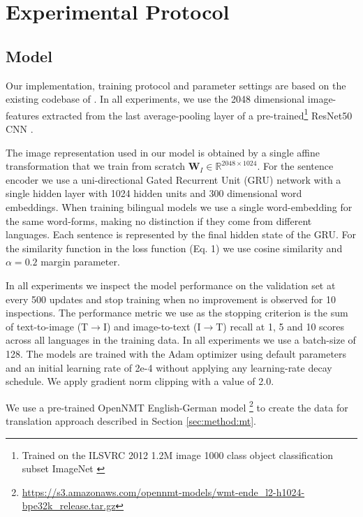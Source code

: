 \section{Experimental Protocol}

\subsection{Model}

Our implementation, training protocol and parameter settings are based on the existing codebase of \cite{kadar2018conll}.
In all experiments, we use the 2048 dimensional image-features extracted from the
last average-pooling layer of a pre-trained\footnote{Trained on the ILSVRC 2012 1.2M image 1000 class object classification
subset ImageNet \cite{russakovsky2015imagenet}} 
ResNet50 CNN \cite{he2016deep}. 
  
The image representation used in our model is obtained by a single 
affine transformation that we train from scratch 
$\mathbf{W}_{I} \in \mathbb{R}^{2048 \times 1024}$. For the sentence
encoder we use a uni-directional Gated Recurrent Unit (GRU) 
network \cite{cho2014properties} with a single hidden layer with 
1024  hidden units and 300 dimensional word embeddings. 
When training bilingual models we use a single word-embedding
for the same word-forms, making no distinction if they come 
from different languages. Each sentence is represented by the final 
hidden state of the GRU. For the similarity function in the loss function (Eq. 1) we use cosine similarity and $\alpha=0.2$ margin parameter.

In all experiments we inspect the model performance on the validation 
set at every 500 updates
and stop training when no improvement is observed for 10 inspections. 
The performance metric we use as the stopping criterion is the 
sum of text-to-image (T$\rightarrow$I) and 
image-to-text (I$\rightarrow$T) recall at 1, 5 and 10 
scores across all languages in the training data. 
In all experiments we use a batch-size of 128.
The models are trained with the Adam optimizer \cite{kingma2014adam} 
using default parameters and an initial learning rate of
\mbox{2e-4}
without applying any learning-rate decay schedule.
We apply gradient norm clipping with a value of 2.0.

We use a pre-trained
OpenNMT \cite{2017opennmt} English-German model \footnote{\footnotesize{\url{https://s3.amazonaws.com/opennmt-models/wmt-ende_l2-h1024-bpe32k_release.tar.gz}}} to create the data for translation approach described in Section \ref{sec:method:mt}.

